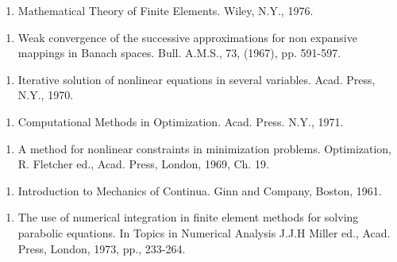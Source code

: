 \begin{thebibliography}{99}
 
  \begin{enumerate}
  \item Mathematical Theory of Finite Elements. Wiley, N.Y.,
 1976.\label{k74:e1}  
  \end{enumerate}
 
 
  \begin{enumerate}
  \item Weak convergence of the successive approximations for non
 expansive mappings in Banach spaces. Bull. A.M.S., 73, (1967),
 pp. 591-597.\label{k75:e1} 
  \end{enumerate}

 
  \begin{enumerate}
  \item  Iterative solution of nonlinear equations in several
 variables. Acad. Press, N.Y., 1970.\label{k76:e1} 
  \end{enumerate}
 
 
  \begin{enumerate}
  \item Computational Methods in Optimization. Acad. Press. N.Y.,
 1971.\label{k77:e1}
  \end{enumerate}
 
 
  \begin{enumerate}
  \item A  method for nonlinear constraints in minimization
 problems. Optimization, R. Fletcher ed., Acad. Press, London,
 1969, Ch. 19. \label{k78:e1}
  \end{enumerate}
 
 
  \begin{enumerate}
  \item  Introduction to Mechanics of Continua. Ginn and Company,
 Boston, 1961.\label{k79:e1}
  \end{enumerate}
 
 
  \begin{enumerate}
  \item The use of numerical integration in finite element methods for
 solving parabolic equations. In Topics in Numerical Analysis J.J.H
 Miller ed., Acad. Press, London, 1973, pp., 233-264.\label{k80:e1} 
 

\end{enumerate}
\end{thebibliography}
